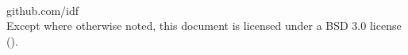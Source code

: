 \onecolumn
\begin{titlepage}
\small{}\\
\end{titlepage}

\newpage
\noindent {} github.com/idf \\
Except where otherwise noted, this document is licensed under a BSD 3.0
license ().
